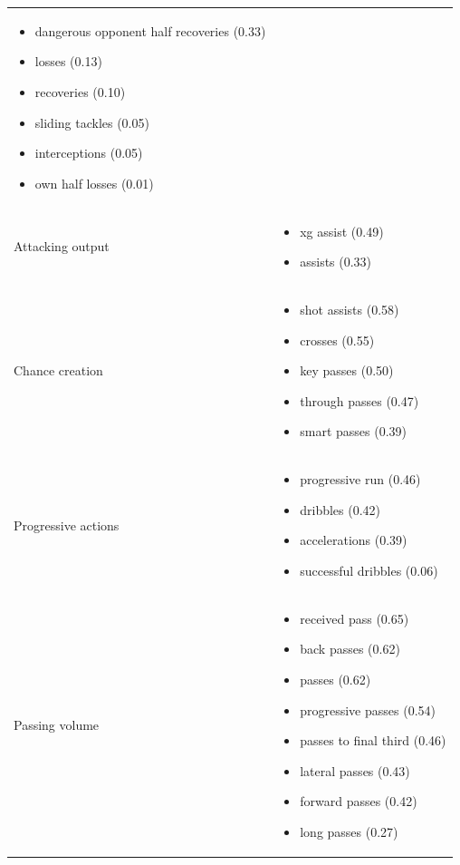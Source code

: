 \begin{longtable}{p{2.6cm}p{13cm}}
\begin{itemize}[nosep,leftmargin=1.1em,topsep=1pt]
    \item dangerous opponent half recoveries (0.33)
    \item losses (0.13)
    \item recoveries (0.10)
    \item sliding tackles (0.05)
    \item interceptions (0.05)
    \item own half losses (0.01)
  \end{itemize}\\
Attacking output & \begin{itemize}[nosep,leftmargin=1.1em,topsep=1pt]
    \item xg assist (0.49)
    \item assists (0.33)
  \end{itemize}\\
Chance creation & \begin{itemize}[nosep,leftmargin=1.1em,topsep=1pt]
    \item shot assists (0.58)
    \item crosses (0.55)
    \item key passes (0.50)
    \item through passes (0.47)
    \item smart passes (0.39)
  \end{itemize}\\
Progressive actions & \begin{itemize}[nosep,leftmargin=1.1em,topsep=1pt]
    \item progressive run (0.46)
    \item dribbles (0.42)
    \item accelerations (0.39)
    \item successful dribbles (0.06)
  \end{itemize}\\
Passing volume & \begin{itemize}[nosep,leftmargin=1.1em,topsep=1pt]
    \item received pass (0.65)
    \item back passes (0.62)
    \item passes (0.62)
    \item progressive passes (0.54)
    \item passes to final third (0.46)
    \item lateral passes (0.43)
    \item forward passes (0.42)
    \item long passes (0.27)

\end{itemize}
\end{longtable}
